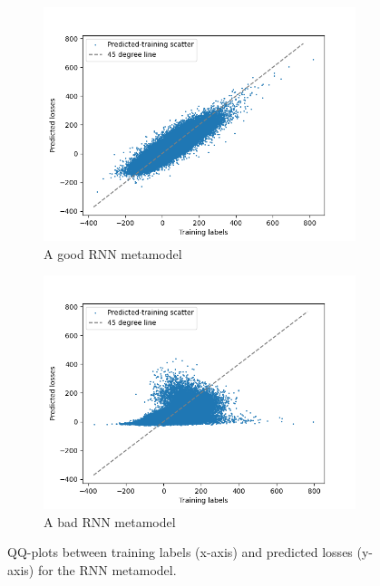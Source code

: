 \documentclass{article}
\begin{document}
\begin{figure}[ht!]
    \centering
    \begin{subfigure}{0.48\textwidth}
        \includegraphics[width=\textwidth]{./figures/qqPlots/rnnGood.png}
        \caption{A good RNN metamodel}
    \end{subfigure}\hfill
    \begin{subfigure}{0.48\textwidth}
        \includegraphics[width=\textwidth]{./figures/qqPlots/rnnBad.png}
        \caption{A bad RNN metamodel}
    \end{subfigure}
    \caption{QQ-plots between training labels (x-axis) and predicted losses (y-axis) for the RNN metamodel.} 
    \label{fig:QQ_RNN}
\end{figure}
\end{document}
